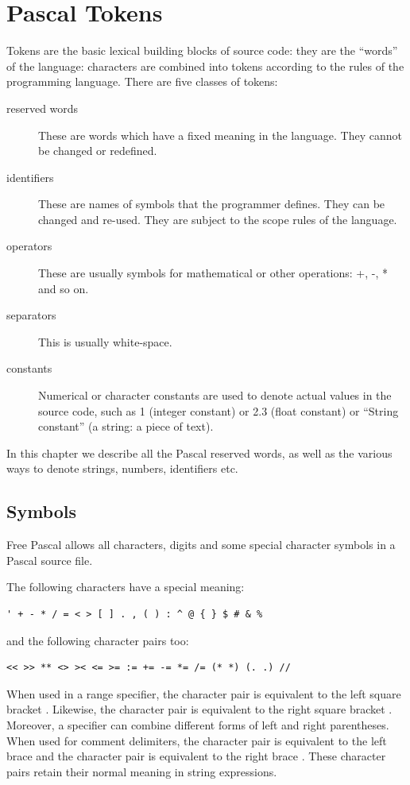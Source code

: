 \chapter{Pascal Tokens}
Tokens are the basic lexical building blocks of source code: they are the
``words'' of the language: characters are combined into tokens according to
the rules of the programming language. There are five classes of tokens:
\begin{description}
\item[reserved words] These are words which have a fixed meaning in the
language. They cannot be changed or redefined.
\item[identifiers] These are names of symbols that the programmer defines.
They can be changed and re-used. They are subject to the scope rules of the
language.
\item[operators] These are usually symbols for mathematical or other
operations: +, -, * and so on.
\item[separators] This is usually white-space.
\item[constants] Numerical or character constants are used to denote actual
values in the source code, such as 1 (integer constant) or 2.3 (float
constant) or ``String constant'' (a string: a piece of text).
\end{description}

In this chapter we describe all the Pascal reserved words, as well as the
various ways to denote strings, numbers, identifiers etc.

\section{Symbols}
Free Pascal allows all characters, digits and some special character symbols
in a Pascal source file.

The following characters have a special meaning:
\begin{verbatim}
' + - * / = < > [ ] . , ( ) : ^ @ { } $ # & %
\end{verbatim}
and the following character pairs too:
\begin{verbatim}
<< >> ** <> >< <= >= := += -= *= /= (* *) (. .) //
\end{verbatim}
When used in a range specifier, the character pair  is equivalent to
the left square bracket \var{[}. Likewise, the character pair  is
equivalent to the right square bracket \var{]}.
Moreover, a specifier can combine different forms of left and right parentheses.
When used for comment delimiters, the character pair \var{(*} is equivalent
to the  left brace \var{\{} and the character pair \var{*)} is equivalent
to the right brace \var{\}}.
These character pairs retain their normal meaning in string expressions.


